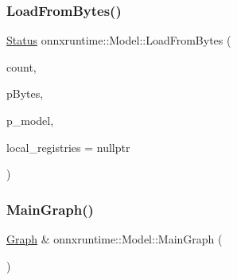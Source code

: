 \mbox{\label{classonnxruntime_1_1Model_a206de3652da23ea5115c292510248da9}} 
\subsubsection{\texorpdfstring{Load\+From\+Bytes()}{LoadFromBytes()}}
{\footnotesize\ttfamily \mbox{\hyperlink{classonnxruntime_1_1common_1_1Status}{Status}} onnxruntime\+::\+Model\+::\+Load\+From\+Bytes (\begin{DoxyParamCaption}\item[{int}]{count,  }\item[{\mbox{\hyperlink{mlasi_8h_a88f941d423cb2a819b70a1358982b1a6}{void}} $\ast$}]{p\+Bytes,  }\item[{std\+::shared\+\_\+ptr$<$ \mbox{\hyperlink{classonnxruntime_1_1Model}{Model}} $>$ \&}]{p\+\_\+model,  }\item[{const \mbox{\hyperlink{namespaceonnxruntime_a37a91305e7190e83fa9c66117a6a4746}{I\+Onnx\+Runtime\+Op\+Schema\+Registry\+List}} $\ast$}]{local\+\_\+registries = {\ttfamily nullptr} }\end{DoxyParamCaption})\hspace{0.3cm}{\ttfamily [static]}}

\mbox{\label{classonnxruntime_1_1Model_a3107455565d368aa674ab19cd156a433}} 
\subsubsection{\texorpdfstring{Main\+Graph()}{MainGraph()}\hspace{0.1cm}{\footnotesize\ttfamily [1/2]}}
{\footnotesize\ttfamily \mbox{\hyperlink{classonnxruntime_1_1Graph}{Graph}} \& onnxruntime\+::\+Model\+::\+Main\+Graph (\begin{DoxyParamCaption}{ }\end{DoxyParamCaption})\hspace{0.3cm}{\ttfamily [noexcept]}}

\mbox{\label{classonnxruntime_1_1Model_a2a97e4baaf0238d56a4c1f583c3430ab}} 
